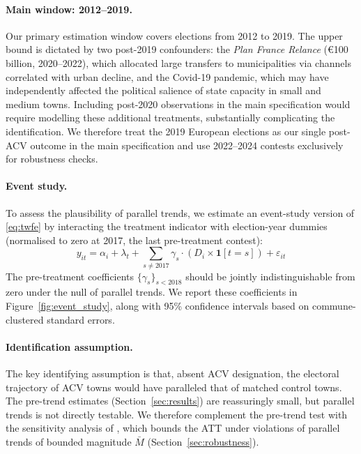 \paragraph{Main window: 2012--2019.} Our primary estimation window covers elections from 2012 to 2019. The upper bound is dictated by two post-2019 confounders: the \textit{Plan France Relance} (€100 billion, 2020--2022), which allocated large transfers to municipalities via channels correlated with urban decline, and the Covid-19 pandemic, which may have independently affected the political salience of state capacity in small and medium towns. Including post-2020 observations in the main specification would require modelling these additional treatments, substantially complicating the identification. We therefore treat the 2019 European elections as our single post-ACV outcome in the main specification and use 2022--2024 contests exclusively for robustness checks.

\paragraph{Event study.} To assess the plausibility of parallel trends, we estimate an event-study version of \eqref{eq:twfe} by interacting the treatment indicator with election-year dummies (normalised to zero at 2017, the last pre-treatment contest):
\begin{equation}
  y_{it} = \alpha_i + \lambda_t + \sum_{s \neq 2017} \gamma_s \cdot (D_i \times \mathbf{1}[t = s]) + \varepsilon_{it}
\end{equation}
The pre-treatment coefficients $\{\gamma_s\}_{s < 2018}$ should be jointly indistinguishable from zero under the null of parallel trends. We report these coefficients in Figure~\ref{fig:event_study}, along with 95\% confidence intervals based on commune-clustered standard errors.

\paragraph{Identification assumption.} The key identifying assumption is that, absent ACV designation, the electoral trajectory of ACV towns would have paralleled that of matched control towns. The pre-trend estimates (Section~\ref{sec:results}) are reassuringly small, but parallel trends is not directly testable. We therefore complement the pre-trend test with the sensitivity analysis of \citet{Rambachan2023}, which bounds the ATT under violations of parallel trends of bounded magnitude $\bar{M}$ (Section~\ref{sec:robustness}).

